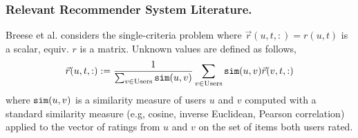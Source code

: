 \subsubsection{Relevant Recommender System Literature.} 
Breese et al. \cite{breese1998empirical} considers the single-criteria problem where $\vec{r}(u,t, :) = r(u,t)$ is a scalar, equiv. $r$ is a matrix. Unknown values are defined as follows, 
\begin{equation}
 \label{eq:breese}
 \vec{r}(u,t,:): = \frac{1}{\sum_{v\in \text{Users}} \texttt{sim}(u,v) } \sum_{v\in \text{Users}} \texttt{sim}(u,v) \vec{r}(v,t,:)
\end{equation}
where $\texttt{sim}(u,v)$ is a similarity measure of users $u$ and $v$ computed with a standard similarity measure (e.g, cosine, inverse Euclidean, Pearson correlation) applied to the vector of ratings from $u$ and $v$ on the set of items both users rated. 

